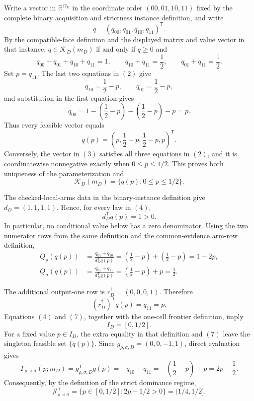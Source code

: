 Write a vector in \(\mathbb R^{\Omega_D}\) in the coordinate order \((00,01,10,11)\) fixed by the complete binary acquisition and strictness instance definition, and write
\[
q=(q_{00},q_{01},q_{10},q_{11})^{\mathsf T}.
\]
By the compatible-face definition and the displayed matrix and value vector in that instance, \(q\in\mathcal K_D(m_D)\) if and only if \(q\geq0\) and
\[
q_{00}+q_{01}+q_{10}+q_{11}=1,
\qquad
q_{10}+q_{11}=\frac12,
\qquad
q_{01}+q_{11}=\frac12.
\tag{2}
\]
Set \(p=q_{11}\).  The last two equations in \((2)\) give
\[
q_{10}=\frac12-p,
\qquad
q_{01}=\frac12-p,
\]
and substitution in the first equation gives
\[
q_{00}=1-\left(\frac12-p\right)-\left(\frac12-p\right)-p=p.
\]
Thus every feasible vector equals
\[
q(p)=\left(p,\frac12-p,\frac12-p,p\right)^{\mathsf T}.
\tag{3}
\]
Conversely, the vector in \((3)\) satisfies all three equations in \((2)\), and it is coordinatewise nonnegative exactly when \(0\leq p\leq1/2\).  This proves both uniqueness of the parameterization and
\[
\mathcal K_D(m_D)=\{q(p):0\leq p\leq1/2\}.
\tag{4}
\]

The checked-local-arms data in the binary-instance definition give \(d_D=(1,1,1,1)\).  Hence, for every law in \((4)\),
\[
d_D^{\mathsf T}q(p)=1>0.
\tag{5}
\]
In particular, no conditional value below has a zero denominator.  Using the two numerator rows from the same definition and the common-evidence arm-row definition,
\[
\begin{aligned}
Q_\rho(q(p))
&=\frac{q_{01}+q_{10}}{d_D^{\mathsf T}q(p)}
=\left(\frac12-p\right)+\left(\frac12-p\right)
=1-2p,\\
Q_\sigma(q(p))
&=\frac{q_{01}+q_{11}}{d_D^{\mathsf T}q(p)}
=\left(\frac12-p\right)+p
=\frac12.
\end{aligned}
\tag{6}
\]

The additional output-one row is \(r_D^\dagger=(0,0,0,1)\).  Therefore
\[
(r_D^\dagger)^{\mathsf T}q(p)=q_{11}=p.
\tag{7}
\]
Equations \((4)\) and \((7)\), together with the one-cell frontier definition, imply
\[
I_D=[0,1/2].
\tag{8}
\]
For a fixed value \(p\in I_D\), the extra equality in that definition and \((7)\) leave the singleton feasible set \(\{q(p)\}\).  Since \(g_{\rho,\sigma,D}=(0,0,-1,1)\), direct evaluation gives
\[
\Gamma_{\rho\prec\sigma}(p;m_D)
=g_{\rho,\sigma,D}^{\mathsf T}q(p)
=-q_{10}+q_{11}
=-\left(\frac12-p\right)+p
=2p-\frac12.
\tag{9}
\]
Consequently, by the definition of the strict dominance regime,
\[
\mathcal J_{\rho\prec\sigma}^+
=\{p\in[0,1/2]:2p-1/2>0\}
=(1/4,1/2].
\tag{10}
\]


